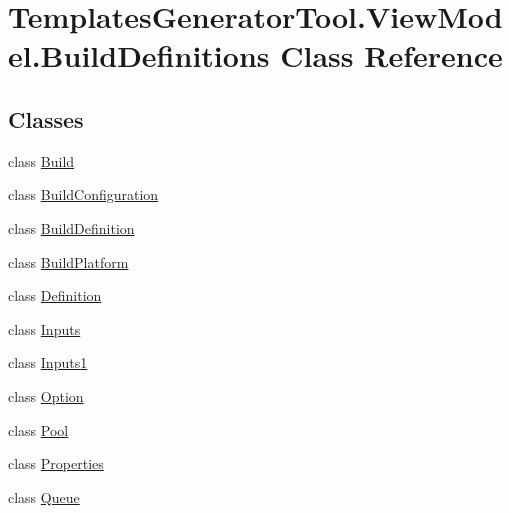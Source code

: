 \hypertarget{class_templates_generator_tool_1_1_view_model_1_1_build_definitions}{}\section{Templates\+Generator\+Tool.\+View\+Model.\+Build\+Definitions Class Reference}
\label{class_templates_generator_tool_1_1_view_model_1_1_build_definitions}
\subsection*{Classes}
\begin{DoxyCompactItemize}
\item 
class \mbox{\hyperlink{class_templates_generator_tool_1_1_view_model_1_1_build_definitions_1_1_build}{Build}}
\item 
class \mbox{\hyperlink{class_templates_generator_tool_1_1_view_model_1_1_build_definitions_1_1_build_configuration}{Build\+Configuration}}
\item 
class \mbox{\hyperlink{class_templates_generator_tool_1_1_view_model_1_1_build_definitions_1_1_build_definition}{Build\+Definition}}
\item 
class \mbox{\hyperlink{class_templates_generator_tool_1_1_view_model_1_1_build_definitions_1_1_build_platform}{Build\+Platform}}
\item 
class \mbox{\hyperlink{class_templates_generator_tool_1_1_view_model_1_1_build_definitions_1_1_definition}{Definition}}
\item 
class \mbox{\hyperlink{class_templates_generator_tool_1_1_view_model_1_1_build_definitions_1_1_inputs}{Inputs}}
\item 
class \mbox{\hyperlink{class_templates_generator_tool_1_1_view_model_1_1_build_definitions_1_1_inputs1}{Inputs1}}
\item 
class \mbox{\hyperlink{class_templates_generator_tool_1_1_view_model_1_1_build_definitions_1_1_option}{Option}}
\item 
class \mbox{\hyperlink{class_templates_generator_tool_1_1_view_model_1_1_build_definitions_1_1_pool}{Pool}}
\item 
class \mbox{\hyperlink{class_templates_generator_tool_1_1_view_model_1_1_build_definitions_1_1_properties}{Properties}}
\item 
class \mbox{\hyperlink{class_templates_generator_tool_1_1_view_model_1_1_build_definitions_1_1_queue}{Queue}}

\end{DoxyCompactItemize}
